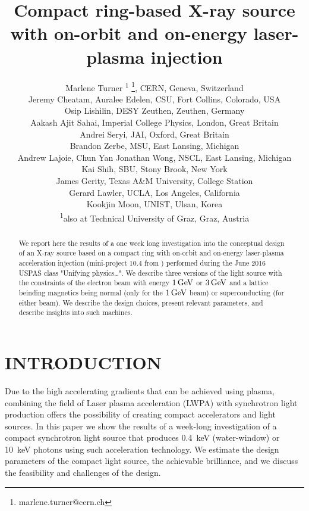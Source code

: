 \documentclass[a4paper,
              ]{jacow}
\begin{document}
\title{Compact ring-based X-ray source with
on-orbit and on-energy laser-plasma
injection}

\author{Marlene Turner \textsuperscript{1} \thanks{marlene.turner@cern.ch}, CERN, Geneva, Switzerland\\
Jeremy Cheatam, Auralee Edelen, CSU, Fort Collins, Colorado, USA \\
Osip Lishilin, DESY Zeuthen, Zeuthen, Germany\\
Aakash Ajit Sahai, Imperial College Physics, London, Great Britain\\
Andrei Seryi, JAI, Oxford, Great Britain\\
Brandon Zerbe, MSU, East Lansing, Michigan\\
Andrew Lajoie, Chun Yan Jonathan Wong, NSCL, East Lansing, Michigan\\
Kai Shih, SBU, Stony Brook, New York\\
James Gerity, Texas A\&M University, College Station\\
Gerard Lawler, UCLA, Los Angeles, California\\
Kookjin Moon, UNIST, Ulsan, Korea\\
		\textsuperscript{1}also at Technical University of Graz, Graz, Austria}
	
\maketitle

%
\begin{abstract}
We report here the results of a one week long investigation into the conceptual design of an X-ray source based on a compact ring with on-orbit and on-energy laser-plasma acceleration injection (mini-project 10.4 from \cite{UNIFYINGPHYSICS}) performed during the June 2016 USPAS class "Unifying physics\ldots". We describe three versions of the light source with the constraints of the electron beam with energy $1\,\rm{GeV}$ or $3\,\rm{GeV}$ and a lattice beinding magnetics being normal (only for the $1\,\rm{GeV}$ beam) or superconducting (for either beam).  We describe the design choices, present relevant parameters, and describe insights into such machines.
\end{abstract}


\section{INTRODUCTION}

Due to the high accelerating gradients that can be achieved using plasma, combining the field of Laser plasma acceleration (LWPA) with synchrotron light production offers the possibility of creating compact accelerators and light sources.
In this paper we show the results of a week-long investigation of a compact synchrotron light source that produces \SI{0.4}{keV} (water-window) or \SI{10}{keV} photons using such acceleration technology. We estimate the design parameters of the compact light source, the achievable brilliance, and we discuss the feasibility and challenges of the design. 
\end{document}
